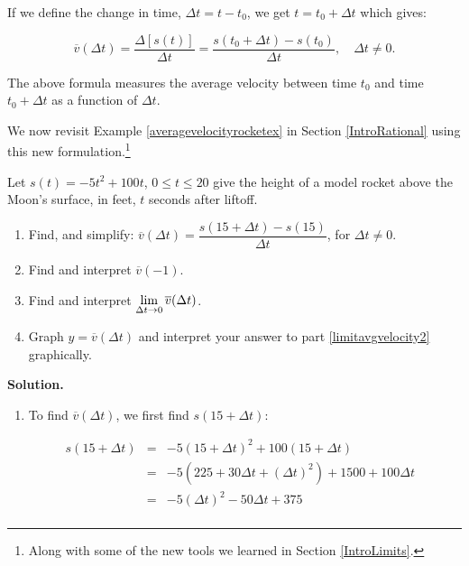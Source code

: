 \documentclass{ximera}
\begin{document}
If we define the change in time, $\Delta t = t - t_{0}$, we get $t = t_{0} + \Delta t$  which gives:

\[ \overline{v}(\Delta t) = \dfrac{\Delta [s(t)]}{\Delta t} = \dfrac{s(t_{0} + \Delta t) - s(t_{0})}{\Delta t}, \quad \Delta t \neq 0. \]

The above formula measures the average velocity between time $t_{0}$ and time $t_{0} + \Delta t$ as a function of $\Delta t$.

\medskip


We now revisit Example \ref{averagevelocityrocketex} in Section \ref{IntroRational} using this new formulation.\footnote{Along with some of the new tools we learned in Section \ref{IntroLimits}.}


\begin{example} \label{averagevelocityrocketexreprise} Let $s(t) = -5t^2+100t$, $0 \leq t \leq 20$ give the height of a model rocket above the Moon's surface, in feet,  $t$ seconds after liftoff.  

\begin{enumerate}

\item  Find, and simplify:  $\overline{v}(\Delta t)  = \dfrac{s(15+ \Delta t) - s(15)}{\Delta t}$, for $\Delta t \neq 0$.

\item  Find and interpret $\overline{v}(-1)$.

\item  \label{limitavgvelocity2} Find and interpret $\ds{\lim_{\Delta t \rightarrow 0}  \overline{v}(\Delta t)}$.

\item  Graph $y = \overline{v}(\Delta t)$ and interpret your answer to part \ref{limitavgvelocity2} graphically.



\end{enumerate}


{\bf Solution.}

\begin{enumerate}

\item  To find $\overline{v}(\Delta t)$, we first find $s(15+\Delta t)$: 

\[ \begin{array}{rclr}  
  s(15+\Delta t) & = & -5(15+\Delta t)^2 + 100(15+\Delta t) & \\ 
  & = & -5(225+30 \Delta t + (\Delta t)^2) + 1500 + 100 \Delta t& \\
 & = & -5(\Delta t)^2 -50 \Delta t +375 & \\
 \end{array} \]


\end{enumerate}
\end{example}
\end{document}
